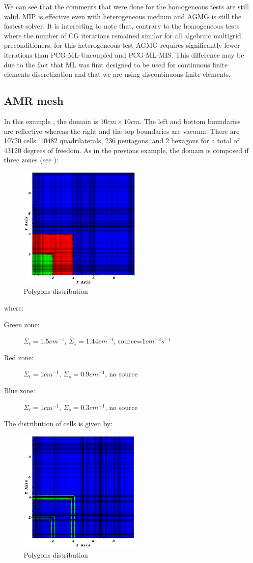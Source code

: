 We can see that the comments that were done for the homogeneous tests are
still valid. MIP is effective even with heterogeneous medium and AGMG is
still the fastest solver. It is interesting to note that, contrary to the
homogeneous tests where the number of CG iterations remained similar for all
algebraic multigrid preconditioners, for this heterogeneous test AGMG requires
significantly fewer iterations than PCG-ML-Uncoupled and PCG-ML-MIS. This
difference may be due to the fact that ML was first designed to be used for
continuous finite elements discretization and that we are using discontinuous
finite elements.

\subsection{AMR mesh}
In this example \cite{mip}, the domain is $10cm\times 10cm$. The left and bottom
boundaries are reflective whereas the right and the top boundaries are vacuum. 
There are 10720 cells: 10482 quadrilaterals, 236 pentagons,
and 2 hexagons for a total of 43120 degrees of freedom. 
As in the previous example, the domain is composed if three zones (see
):
\begin{figure}[H]
  \centering
  \includegraphics[width=6cm]{zone_amr}
  \caption{Polygons distribution}
  \label{zone_amr}
\end{figure}
where:
\begin{description}
  \item[Green zone:] $\Sigma_t=1.5cm^{-1}$, $\Sigma_s=1.44cm^{-1}$,
    source=$1cm^{-3}s^{-1}$
  \item[Red zone:] $\Sigma_t=1cm^{-1}$, $\Sigma_s=0.9cm^{-1}$, no source
  \item[Blue zone:] $\Sigma_t=1cm^{-1}$, $\Sigma_s=0.3cm^{-1}$, no source
\end{description}
The distribution of cells is given  by:
\begin{figure}[H]
  \centering
  \includegraphics[width=6cm]{polygon_amr}
  \caption{Polygons distribution}
  \label{fig_pol_dist}
\end{figure}
